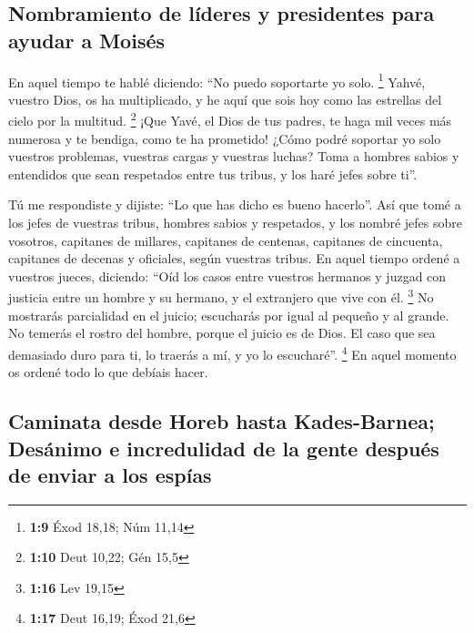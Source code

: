 \hypertarget{nombramiento-de-luxedderes-y-presidentes-para-ayudar-a-moisuxe9s}{%
\subsection{Nombramiento de líderes y presidentes para ayudar a
Moisés}\label{nombramiento-de-luxedderes-y-presidentes-para-ayudar-a-moisuxe9s}}

 En aquel tiempo te hablé diciendo: ``No puedo soportarte
yo solo. \footnote{\textbf{1:9} Éxod 18,18; Núm 11,14} 
Yahvé, vuestro Dios, os ha multiplicado, y he aquí que sois hoy como las
estrellas del cielo por la multitud. \footnote{\textbf{1:10} Deut 10,22;
  Gén 15,5}  ¡Que Yavé, el Dios de tus padres, te haga
mil veces más numerosa y te bendiga, como te ha prometido!
 ¿Cómo podré soportar yo solo vuestros problemas,
vuestras cargas y vuestras luchas?  Toma a hombres sabios
y entendidos que sean respetados entre tus tribus, y los haré jefes
sobre ti''.

 Tú me respondiste y dijiste: ``Lo que has dicho es bueno
hacerlo''.  Así que tomé a los jefes de vuestras tribus,
hombres sabios y respetados, y los nombré jefes sobre vosotros,
capitanes de millares, capitanes de centenas, capitanes de cincuenta,
capitanes de decenas y oficiales, según vuestras tribus. 
En aquel tiempo ordené a vuestros jueces, diciendo: ``Oíd los casos
entre vuestros hermanos y juzgad con justicia entre un hombre y su
hermano, y el extranjero que vive con él. \footnote{\textbf{1:16} Lev
  19,15}  No mostrarás parcialidad en el juicio;
escucharás por igual al pequeño y al grande. No temerás el rostro del
hombre, porque el juicio es de Dios. El caso que sea demasiado duro para
ti, lo traerás a mí, y yo lo escucharé''. \footnote{\textbf{1:17} Deut
  16,19; Éxod 21,6}  En aquel momento os ordené todo lo
que debíais hacer.

\hypertarget{caminata-desde-horeb-hasta-kades-barnea-desuxe1nimo-e-incredulidad-de-la-gente-despuuxe9s-de-enviar-a-los-espuxedas}{%
\subsection{Caminata desde Horeb hasta Kades-Barnea; Desánimo e
incredulidad de la gente después de enviar a los
espías}\label{caminata-desde-horeb-hasta-kades-barnea-desuxe1nimo-e-incredulidad-de-la-gente-despuuxe9s-de-enviar-a-los-espuxedas}}

